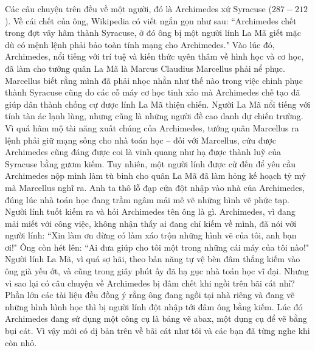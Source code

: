 \begin{multicols}{2}
	Các câu chuyện trên đều về một người, đó là Archimedes xứ Syracuse ($287-212$). Về cái chết của ông, Wikipedia có viết ngắn gọn như sau: ``Archimedes chết trong đợt vây hãm thành Syracuse, ở đó ông bị một người lính La Mã giết mặc dù có mệnh lệnh phải bảo toàn tính mạng cho Archimedes." Vào lúc đó, Archimedes,  nổi tiếng với trí tuệ và kiến thức uyên thâm về hình học và cơ học, đã làm cho tướng quân La Mã là Marcus Claudius Marcellus phải nể phục. Marcellus biết rằng mình đã phải nhọc nhằn như thế nào trong việc chinh phục thành Syracuse cũng do các cỗ máy cơ học tinh xảo mà Archimedes chế tạo đã giúp dân thành chống cự được lính La Mã thiện chiến. Người La Mã nổi tiếng với tính tàn ác lạnh lùng, nhưng cũng là những người đề cao danh dự chiến trường. Vì quá hâm mộ tài năng xuất chúng của Archimedes, tướng quân Marcellus ra lệnh phải giữ mạng sống cho nhà toán học -- đối với Marcellus, cứu được Archimedes cũng đáng được coi là vinh quang như hạ được thành luỹ của Syracuse bằng gươm kiếm.
	\vskip 0.1cm
	Tuy nhiên, một người lính được cử đến để yêu cầu Archimedes nộp mình làm tù binh cho quân La Mã đã làm hỏng kế hoạch tỷ mỷ mà Marcellus nghĩ ra. Anh ta thô lỗ đạp cửa đột nhập vào nhà của Archimedes, đúng lúc  nhà toán học đang trầm ngâm mải mê vẽ những hình vẽ phức tạp. Người lính tuốt kiếm ra và hỏi Archimedes tên ông là gì. Archimedes, vì đang mải miết với công việc, không nhận thấy ai đang chỉ kiếm về mình, đã nói với người lính: ``Xin làm ơn đừng có làm xáo trộn những hình vẽ của tôi, anh bạn ơi!" Ông còn hét lên: ``Ai đưa giúp cho tôi một trong những cái máy của tôi nào!" Người lính La Mã, vì quá sợ hãi, theo bản năng tự vệ bèn đâm thẳng kiếm vào ông già yếu ớt, và cũng trong giây phút ấy đã hạ gục nhà toán học vĩ đại.
	\vskip 0.1cm
	Nhưng vì sao lại có câu chuyện về Archimedes bị đâm chết khi ngồi trên bãi cát nhỉ? Phần lớn các tài liệu đều đồng ý rằng ông đang ngồi tại nhà riêng và đang vẽ những hình hình học thì bị người lính đột nhập tới đâm ông bằng kiếm. Lúc đó Archimedes đang sử dụng một công cụ là bảng vẽ abax, một dụng cụ để vẽ bằng bụi cát. Vì vậy mới có dị bản trên về bãi cát như tôi và các bạn đã từng nghe khi còn nhỏ.
	\begin{figure}[H]
		\vspace*{-5pt}
		\centering
		\captionsetup{labelformat= empty, justification=centering}

\end{figure}
\end{multicols}
